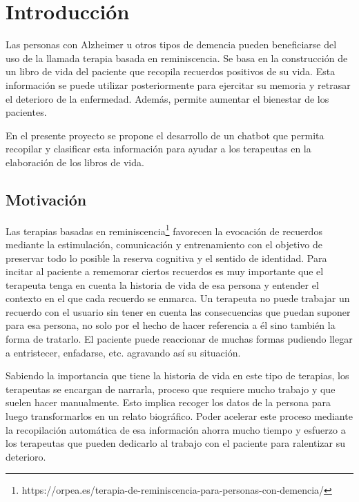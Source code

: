 \chapter{Introducción}
\label{cap:introduccion}



Las personas con Alzheimer u otros tipos de demencia pueden beneficiarse del uso de la llamada terapia basada en reminiscencia. Se basa en la construcción de un libro de vida del paciente que recopila recuerdos positivos de su vida. Esta información se puede utilizar posteriormente para ejercitar su memoria y retrasar el deterioro de la enfermedad. Además, permite aumentar el bienestar de los pacientes.

En el presente proyecto se propone el desarrollo de un chatbot que permita recopilar y clasificar esta información para ayudar a los terapeutas en la elaboración de los libros de vida.


\section{Motivación}

Las terapias basadas en reminiscencia\footnote{https://orpea.es/terapia-de-reminiscencia-para-personas-con-demencia/} favorecen la evocación de recuerdos mediante la estimulación, comunicación y entrenamiento con el objetivo de preservar todo lo posible la reserva cognitiva y el sentido de identidad. Para incitar al paciente a rememorar ciertos recuerdos es muy importante que el terapeuta tenga en cuenta la historia de vida de esa persona y entender el contexto en el que cada recuerdo se enmarca. Un terapeuta no puede trabajar un recuerdo con el usuario sin tener en cuenta las consecuencias que puedan suponer para esa persona, no solo por el hecho de hacer referencia a él sino también la forma de tratarlo. El paciente puede reaccionar de muchas formas pudiendo llegar a entristecer, enfadarse, etc. agravando así su situación.

Sabiendo la importancia que tiene la historia de vida en este tipo de terapias, los terapeutas se encargan de narrarla, proceso que requiere mucho trabajo y que suelen hacer manualmente. Esto implica recoger los datos de la persona para luego transformarlos en un relato biográfico. Poder acelerar este proceso mediante la recopilación automática de esa información ahorra mucho tiempo y esfuerzo a los terapeutas que pueden dedicarlo al trabajo con el paciente para ralentizar su deterioro.


